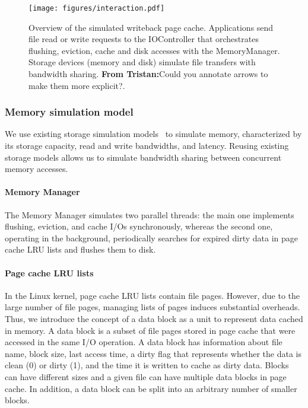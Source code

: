 \documentclass[conference]{IEEEtran}
\newcommand{\tristan}[1]{\color{orange}\textbf{From Tristan:}#1\color{black}}
\begin{document}
            \begin{figure}
                   \centering
                   \texttt{[image: figures/interaction.pdf]}
                   \caption{Overview of the simulated writeback page cache.
                   Applications send file read or write requests to the
                   IOController that orchestrates flushing, eviction, cache
                   and disk accesses with the MemoryManager. Storage
                   devices (memory and disk) simulate file transfers with
                   bandwidth sharing. \tristan{Could you annotate arrows to
                   make them more explicit?}.}
                   \label{fig:interaction}
            \end{figure}

            \subsubsection{Memory simulation model}
            
            We use existing storage simulation models~\cite{lebre2015} to simulate memory,
            characterized by its storage capacity, read and write bandwidths,
            and latency. Reusing existing storage models allows us 
            to simulate bandwidth sharing between concurrent memory accesses.

            \paragraph*{Memory Manager}
            The Memory Manager simulates two parallel threads: the main one
            implements flushing, eviction, and cache I/Os synchronously,
            whereas the second one, operating in the background,
            periodically searches for expired dirty data in page cache LRU
            lists and flushes them to disk.

            \paragraph*{Page cache LRU lists}
            In the Linux kernel, page cache LRU lists contain file pages. However, 
            due to the large number of file pages, managing lists of pages 
            induces substantial overheads.
            Thus, we introduce the concept of a data block as a unit to represent data 
            cached in memory. A data block is a subset of file pages stored in
            page cache that were accessed in the same I/O operation. 
            A data block has information about file name, block size, last access 
            time, a dirty flag that represents whether the data is clean (0) 
            or dirty (1), and the time it is written to cache as dirty data. 
            Blocks can have different sizes and a given file can have multiple 
            data blocks in page cache. In addition, a data block can be split into an 
            arbitrary number of smaller blocks.
\end{document}
